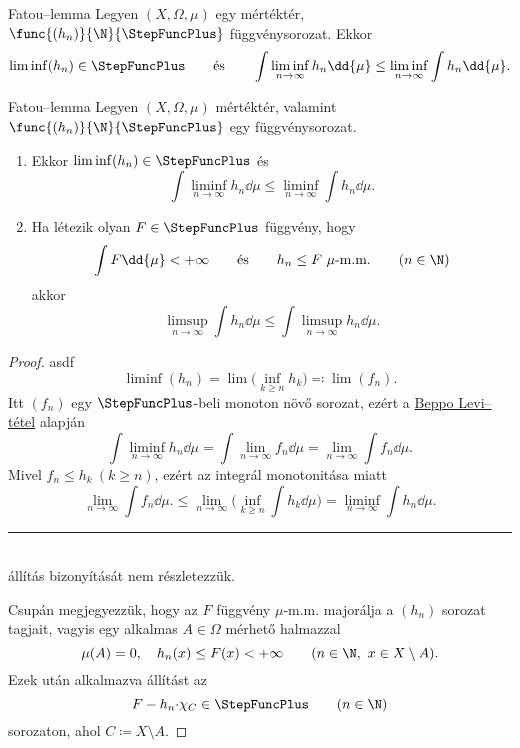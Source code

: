 \documentclass[
]{elteikthesis}[2024/04/26]
\begin{document}
	
	\begin{lemma}{Fatou--lemma}{}
		Legyen \( (X, \Omega, \mu) \) egy mértéktér, 
		\( \func{(h_n)}{\N}{\StepFuncPlus}\) függvénysorozat. 
		Ekkor
		\[
			\liminf(h_n) \in \StepFuncPlus
			\qquad \text{és} \qquad
			\int \liminf_{n \to \infty} h_n \dd{\mu} \leq \liminf_{n \to \infty} \int h_n \dd{\mu}.
		\]
	\end{lemma}
	\begin{lemma}{Fatou--lemma}{}
		Legyen \( (X, \Omega, \mu) \) mértéktér, 
		valamint \( \func{(h_n)}{\N}{\StepFuncPlus} \) egy függvénysorozat.
		\begin{enumerate}
			\item\label{eq:fatou-01}
			Ekkor \( \liminf(h_n) \in \StepFuncPlus \) és
			\[
				\int \liminf_{n \to \infty} h_n \dd{\mu} \leq 
				\liminf_{n \to \infty} \int h_n \dd{\mu}.
			\]
			
			\item\label{eq:fatou-02}
			Ha létezik olyan \( F \in \StepFuncPlus \) függvény, hogy
			\[
				\int F \dd{\mu} < +\infty
				\qquad \text{és} \qquad
				h_n \leq F \ \mu \text{-m.m.} \qquad (n \in \N)
			\]
			akkor
			\[
				\limsup_{n \to \infty} \int h_n \dd{\mu} \leq 
				\int \limsup_{n \to \infty} h_n \dd{\mu}.
			\]
		\end{enumerate}
	\end{lemma}
	
	\begin{proof}
		asdf
		\[
			\liminf(h_n) = 
			\lim \bigl( \inf_{k \geq n} h_k \bigr) \eqcolon
			\lim( f_n ).
		\]
		Itt \( (f_n) \) egy \( \StepFuncPlus \)-beli monoton növő sorozat, 
		ezért a \hyperref[th:beppo-levi]{Beppo Levi--tétel} alapján
		\[
			\int \liminf_{n \to \infty} h_n \dd{\mu} =
			\int \lim_{n \to \infty} f_n \dd{\mu} =
			\lim_{n \to \infty} \int f_n \dd{\mu}.
		\]
		Mivel \( f_n \leq h_k \ (k \geq n) \),
		ezért az integrál monotonitása miatt
		\[
			\lim_{n \to \infty} \int f_n \dd{\mu}. \leq
			\lim_{n \to \infty} \biggl( \inf_{k \geq n} \int h_k \dd{\mu} \biggr) =
			\liminf_{n \to \infty} \int h_n \dd{\mu}.
		\]
		
		\noindent\rule{\linewidth}{0.4pt}\\
		
		 állítás bizonyítását nem részletezzük.
		
		Csupán megjegyezzük, hogy az \( F \) függvény \( \mu \)-m.m. majorálja a \( (h_n) \) sorozat tagjait, vagyis egy alkalmas \( A \in \Omega \) mérhető halmazzal
		\[
			\mu(A) = 0, \quad 
			h_n(x) \leq F(x) < +\infty \qquad (n \in \N, \ x \in X \setminus A).
		\]
		Ezek után alkalmazva  állítást az
		\[
			F - h_n {\cdot} \chi_C \in \StepFuncPlus \qquad (n \in \N)
		\]
		sorozaton, ahol \( C \coloneq X \setminus A \).
	\end{proof}
	
	
	
\end{document}
